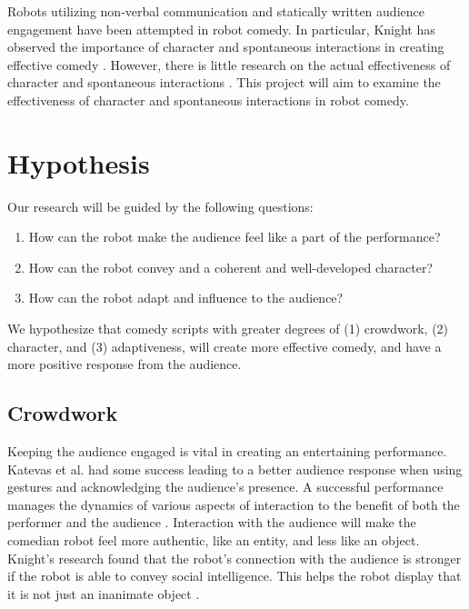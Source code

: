 \documentclass[onecolumn, draftclsnofoot,10pt, compsoc]{IEEEtran}
\begin{document}

Robots utilizing non-verbal communication and statically written audience engagement have been attempted in robot comedy. In particular, Knight has observed the importance of character and spontaneous interactions in creating effective comedy \cite{KnightEightLessons:2011}. However, there is little research on the actual effectiveness of character and spontaneous interactions \cite{KatevasRobot:2014}. This project will aim to examine the effectiveness of character and spontaneous interactions in robot comedy.

\section{Hypothesis}

Our research will be guided by the following questions:
\begin{enumerate}[\IEEEsetlabelwidth{6}]
\item How can the robot make the audience feel like a part of the performance?
\item How can the robot convey and a coherent and well-developed character?
\item How can the robot adapt and influence to the audience?
\end{enumerate}

We hypothesize that comedy scripts with greater degrees of (1) crowdwork, (2) character, and (3) adaptiveness, will create more effective comedy, and have a more positive response from the audience.

\subsection{Crowdwork}

Keeping the audience engaged is vital in creating an entertaining performance. Katevas et al. had some success leading to a better audience response when using gestures and acknowledging the audience's presence. A successful performance manages the dynamics of various aspects of interaction to the benefit of both the performer and the audience \cite{RobotComedyLab:2015}. Interaction with the audience will make the comedian robot feel more authentic, like an entity, and less like an object. Knight's research found that the robot's connection with the audience is stronger if the robot is able to convey social intelligence. This helps the robot display that it is not just an inanimate object \cite {KnightEightLessons:2011}.
\end{document}
